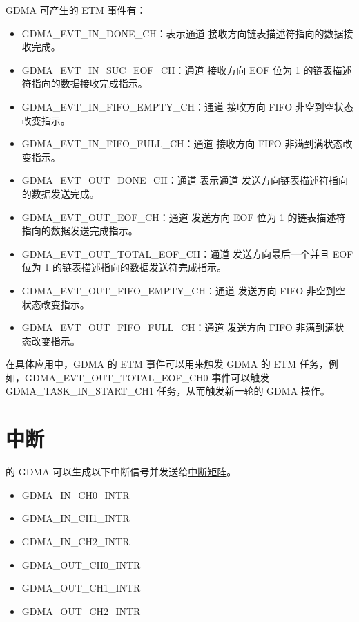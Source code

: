 \documentclass[main\_\_CN.tex]{subfiles}
\begin{document}
GDMA 可产生的 ETM 事件有：

\begin{itemize}
\item GDMA\_EVT\_IN\_DONE\_CH：表示通道  接收方向链表描述符指向的数据接收完成。
\item GDMA\_EVT\_IN\_SUC\_EOF\_CH：通道  接收方向 EOF 位为 1 的链表描述符指向的数据接收完成指示。
\item GDMA\_EVT\_IN\_FIFO\_EMPTY\_CH：通道  接收方向 FIFO 非空到空状态改变指示。
\item GDMA\_EVT\_IN\_FIFO\_FULL\_CH：通道  接收方向 FIFO 非满到满状态改变指示。
\item GDMA\_EVT\_OUT\_DONE\_CH：通道  表示通道  发送方向链表描述符指向的数据发送完成。
\item GDMA\_EVT\_OUT\_EOF\_CH：通道  发送方向 EOF 位为 1 的链表描述符指向的数据发送完成指示。
\item GDMA\_EVT\_OUT\_TOTAL\_EOF\_CH：通道  发送方向最后一个并且 EOF 位为 1 的链表描述指向的数据发送符完成指示。
\item GDMA\_EVT\_OUT\_FIFO\_EMPTY\_CH：通道  发送方向 FIFO 非空到空状态改变指示。
\item GDMA\_EVT\_OUT\_FIFO\_FULL\_CH：通道  发送方向 FIFO 非满到满状态改变指示。
\end{itemize}

在具体应用中，GDMA 的 ETM 事件可以用来触发 GDMA 的 ETM 任务，例如，GDMA\_EVT\_OUT\_TOTAL\_EOF\_CH0 事件可以触发 GDMA\_TASK\_IN\_START\_CH1 任务，从而触发新一轮的 GDMA 操作。


\section{中断}

\chipname{} 的 GDMA 可以生成以下中断信号并发送给\hyperref[mod:intmtrx]{中断矩阵}。

    \begin{itemize}
        \item GDMA\_IN\_CH0\_INTR
        \item GDMA\_IN\_CH1\_INTR
        \item GDMA\_IN\_CH2\_INTR
        \item GDMA\_OUT\_CH0\_INTR
        \item GDMA\_OUT\_CH1\_INTR
        \item GDMA\_OUT\_CH2\_INTR
    \end{itemize}
\end{document}
